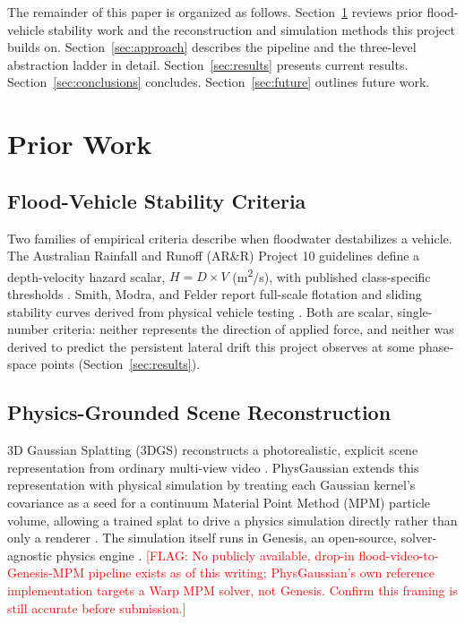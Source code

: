 \documentclass[conference]{IEEEtran}
\newcommand{\FLAG}[1]{\textcolor{red}{[FLAG: #1]}}
\begin{document}
The remainder of this paper is organized as follows. Section~\ref{sec:prior} reviews prior flood-vehicle stability work and the reconstruction and simulation methods this project builds on. Section~\ref{sec:approach} describes the pipeline and the three-level abstraction ladder in detail. Section~\ref{sec:results} presents current results. Section~\ref{sec:conclusions} concludes. Section~\ref{sec:future} outlines future work.

\section{Prior Work}
\label{sec:prior}

\subsection{Flood-Vehicle Stability Criteria}
Two families of empirical criteria describe when floodwater destabilizes a vehicle. The Australian Rainfall and Runoff (AR\&R) Project 10 guidelines define a depth-velocity hazard scalar, $H = D \times V$ (m\textsuperscript{2}/s), with published class-specific thresholds \cite{shand2011}. Smith, Modra, and Felder report full-scale flotation and sliding stability curves derived from physical vehicle testing \cite{smithmodrafelder2019}. Both are scalar, single-number criteria: neither represents the direction of applied force, and neither was derived to predict the persistent lateral drift this project observes at some phase-space points (Section~\ref{sec:results}).

\subsection{Physics-Grounded Scene Reconstruction}
3D Gaussian Splatting (3DGS) reconstructs a photorealistic, explicit scene representation from ordinary multi-view video \cite{kerbl20233dgs}. PhysGaussian extends this representation with physical simulation by treating each Gaussian kernel's covariance as a seed for a continuum Material Point Method (MPM) particle volume, allowing a trained splat to drive a physics simulation directly rather than only a renderer \cite{xie2023physgaussian}. The simulation itself runs in Genesis, an open-source, solver-agnostic physics engine \cite{genesis2024}. \FLAG{No publicly available, drop-in flood-video-to-Genesis-MPM pipeline exists as of this writing; PhysGaussian's own reference implementation targets a Warp MPM solver, not Genesis. Confirm this framing is still accurate before submission.}
\end{document}
